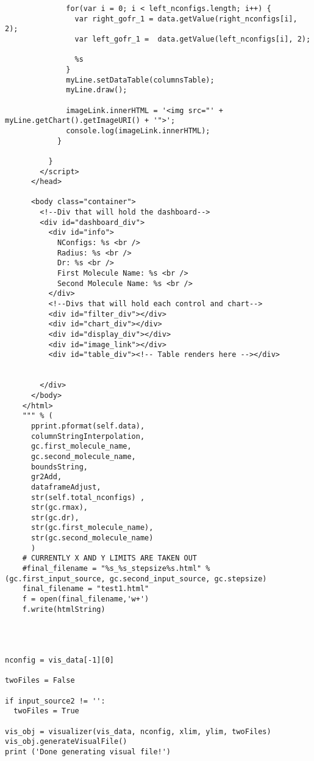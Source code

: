 \begin{verbatim}
              for(var i = 0; i < left_nconfigs.length; i++) {
                var right_gofr_1 = data.getValue(right_nconfigs[i], 2);
                var left_gofr_1 =  data.getValue(left_nconfigs[i], 2); 
                
                %s
              }
              myLine.setDataTable(columnsTable);
              myLine.draw();
              
              imageLink.innerHTML = '<img src="' + myLine.getChart().getImageURI() + '">';
              console.log(imageLink.innerHTML);
            }
            
          }
        </script>
      </head>

      <body class="container">
        <!--Div that will hold the dashboard-->
        <div id="dashboard_div">
          <div id="info">
            NConfigs: %s <br /> 
            Radius: %s <br /> 
            Dr: %s <br />
            First Molecule Name: %s <br />
            Second Molecule Name: %s <br />
          </div>
          <!--Divs that will hold each control and chart-->
          <div id="filter_div"></div>
          <div id="chart_div"></div>
          <div id="display_div"></div>
          <div id="image_link"></div>
          <div id="table_div"><!-- Table renders here --></div>
          
          
        </div>
      </body>
    </html>
    """ % (
      pprint.pformat(self.data), 
      columnStringInterpolation,
      gc.first_molecule_name, 
      gc.second_molecule_name,
      boundsString,
      gr2Add,
      dataframeAdjust,
      str(self.total_nconfigs) , 
      str(gc.rmax), 
      str(gc.dr), 
      str(gc.first_molecule_name), 
      str(gc.second_molecule_name)
      )
    # CURRENTLY X AND Y LIMITS ARE TAKEN OUT
    #final_filename = "%s_%s_stepsize%s.html" % (gc.first_input_source, gc.second_input_source, gc.stepsize)
    final_filename = "test1.html"
    f = open(final_filename,'w+')
    f.write(htmlString)

    


nconfig = vis_data[-1][0]

twoFiles = False

if input_source2 != '':
  twoFiles = True

vis_obj = visualizer(vis_data, nconfig, xlim, ylim, twoFiles) 
vis_obj.generateVisualFile()
print ('Done generating visual file!')








\end{verbatim}
